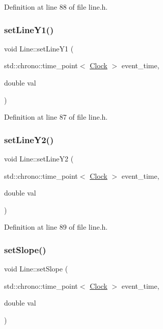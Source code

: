 Definition at line 88 of file line.\+h.

\mbox{\label{class_line_af236c5ddb0d125b388621b3597266a95}} 
\subsubsection{\texorpdfstring{set\+Line\+Y1()}{setLineY1()}}
{\footnotesize\ttfamily void Line\+::set\+Line\+Y1 (\begin{DoxyParamCaption}\item[{std\+::chrono\+::time\+\_\+point$<$ \hyperlink{universe_8h_a0ef8d951d1ca5ab3cfaf7ab4c7a6fd80}{Clock} $>$}]{event\+\_\+time,  }\item[{double}]{val }\end{DoxyParamCaption})\hspace{0.3cm}{\ttfamily [inline]}}



Definition at line 87 of file line.\+h.

\mbox{\label{class_line_a671f64c437fe1bef798476d93c675099}} 
\subsubsection{\texorpdfstring{set\+Line\+Y2()}{setLineY2()}}
{\footnotesize\ttfamily void Line\+::set\+Line\+Y2 (\begin{DoxyParamCaption}\item[{std\+::chrono\+::time\+\_\+point$<$ \hyperlink{universe_8h_a0ef8d951d1ca5ab3cfaf7ab4c7a6fd80}{Clock} $>$}]{event\+\_\+time,  }\item[{double}]{val }\end{DoxyParamCaption})\hspace{0.3cm}{\ttfamily [inline]}}



Definition at line 89 of file line.\+h.

\mbox{\label{class_line_a3fb9e9eab13d146feff0bc891709eaf9}} 
\subsubsection{\texorpdfstring{set\+Slope()}{setSlope()}}
{\footnotesize\ttfamily void Line\+::set\+Slope (\begin{DoxyParamCaption}\item[{std\+::chrono\+::time\+\_\+point$<$ \hyperlink{universe_8h_a0ef8d951d1ca5ab3cfaf7ab4c7a6fd80}{Clock} $>$}]{event\+\_\+time,  }\item[{double}]{val }\end{DoxyParamCaption})\hspace{0.3cm}{\ttfamily [inline]}}



